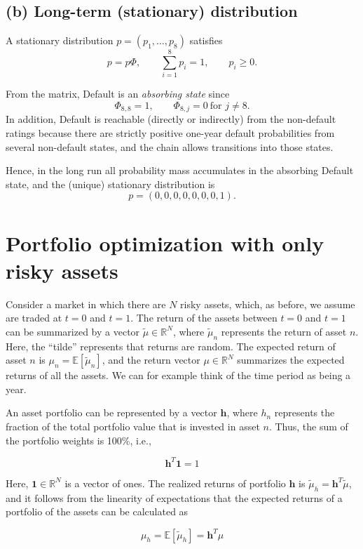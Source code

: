 \documentclass{article}
\begin{document}
\subsection*{(b) Long-term (stationary) distribution}

A stationary distribution $p=(p_1,\dots,p_8)$ satisfies
\[
p=p\Phi,\qquad \sum_{i=1}^8 p_i=1,\qquad p_i\ge 0.
\]

From the matrix, Default is an \emph{absorbing state} since
\[
\Phi_{8,8}=1,\qquad \Phi_{8,j}=0\ \text{for } j\neq 8.
\]
In addition, Default is reachable (directly or indirectly) from the non-default ratings
because there are strictly positive one-year default probabilities from several non-default states,
and the chain allows transitions into those states.

Hence, in the long run all probability mass accumulates in the absorbing Default state, and the
(unique) stationary distribution is
\[
\boxed{p=(0,0,0,0,0,0,0,1).}
\]




\newpage
\section{Portfolio optimization with only risky assets}

Consider a market in which there are $N$ risky assets, which, as before, we assume are traded at $t = 0$ and $t = 1$. The return of the assets between $t = 0$ and $t = 1$ can be summarized by a vector $\tilde{\mu} \in \mathbb{R}^N$, where $\tilde{\mu}_n$ represents the return of asset $n$. Here, the ``tilde'' represents that returns are random. The expected return of asset $n$ is $\mu_n = \mathbb{E}[\tilde{\mu}_n]$, and the return vector $\mu \in \mathbb{R}^N$ summarizes the expected returns of all the assets. We can for example think of the time period as being a year.

An asset portfolio can be represented by a vector $\mathbf{h}$, where $h_n$ represents the fraction of the total portfolio value that is invested in asset $n$. Thus, the sum of the portfolio weights is 100\%, i.e.,

\[
\mathbf{h}^T \mathbf{1} = 1
\]

Here, $\mathbf{1} \in \mathbb{R}^N$ is a vector of ones. The realized returns of portfolio $\mathbf{h}$ is $\tilde{\mu}_h = \mathbf{h}^T \tilde{\mu}$, and it follows from the linearity of expectations that the expected returns of a portfolio of the assets can be calculated as

\[
\mu_h = \mathbb{E}[\tilde{\mu}_h] = \mathbf{h}^T \mu
\]
\end{document}
